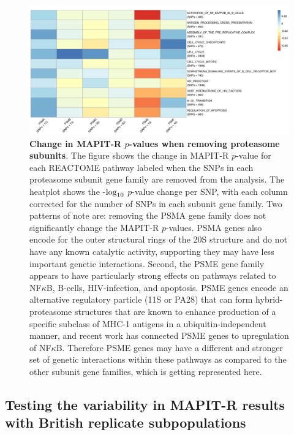 \documentclass[12pt,a4paper]{article}
\def\log{{\rm log}}
\begin{document}

\begin{figure}[]
\centering
\includegraphics[scale=.45]{Images/Main/InterPath_Main_Figure_Proteasome_vs1.png}
\caption[TBD]{\textbf{Change in MAPIT-R $p$-values when removing proteasome subunits}. The figure shows the change in MAPIT-R $p$-value for each REACTOME pathway labeled when the SNPs in each proteasome subunit gene family are removed from the analysis. The heatplot shows the -$\log_{10}$ $p$-value change per SNP, with each column corrected for the number of SNPs in each subunit gene family. Two patterns of note are: removing the PSMA gene family does not significantly change the MAPIT-R $p$-values. PSMA genes also encode for the outer structural rings of the 20S structure and do not have any known catalytic activity, supporting they may have less important genetic interactions. Second, the PSME gene family appears to have particularly strong effects on pathways related to NF$\kappa$B, B-cells, HIV-infection, and apoptosis. PSME genes encode an alternative regulatory particle (11S or PA28) that can form hybrid-proteasome structures that are known to enhance production of a specific subclass of MHC-1 antigens in a ubiquitin-independent manner, and recent work has connected PSME genes to upregulation of NF$\kappa$B. Therefore PSME genes may have a different and stronger set of genetic interactions within these pathways as compared to the other subunit gene families, which is getting represented here.
}
\label{InterPath-Main-Figure-Proteasome-Heatplot}
\end{figure}

\subsection{Testing the variability in MAPIT-R results with British replicate subpopulations}
\end{document}
